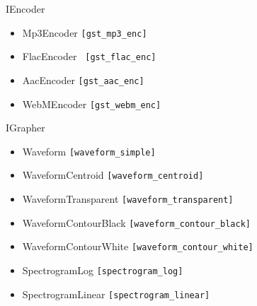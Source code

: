 \documentclass[10pt, final, hyperref, table]{beamer}
\begin{document}
\begin{frame}
\begin{minipage}{0.5\linewidth}
\begin{block}{IEncoder}
\begin{itemize}
      \item Mp3Encoder \texttt{[gst\_mp3\_enc]}
      \item FlacEncoder \texttt{ [gst\_flac\_enc]}
      \item AacEncoder \texttt{[gst\_aac\_enc]}
      \item WebMEncoder \texttt{[gst\_webm\_enc]}
      \end{itemize}
    \end{block}
  \begin{block}{IGrapher}
      \begin{itemize}
      \item Waveform \texttt{[waveform\_simple]}
      \item WaveformCentroid \texttt{[waveform\_centroid]}
      \item \alert{WaveformTransparent} \texttt{[waveform\_transparent]}
      \item WaveformContourBlack \texttt{[waveform\_contour\_black]}
      \item WaveformContourWhite \texttt{[waveform\_contour\_white]}
      \item SpectrogramLog \texttt{[spectrogram\_log]}
      \item \alert{SpectrogramLinear} \texttt{[spectrogram\_linear]}
      \end{itemize}
    \end{block}
   \end{minipage}

\end{frame}
\end{document}
